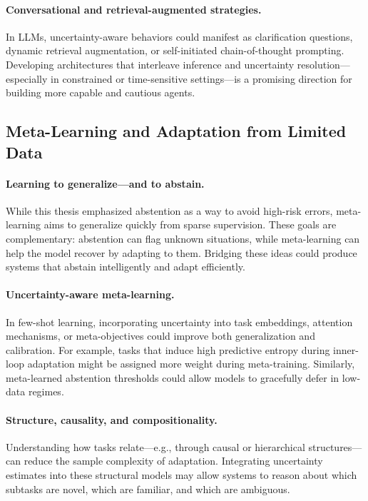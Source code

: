 \paragraph{Conversational and retrieval-augmented strategies.} In LLMs, uncertainty-aware behaviors could manifest as clarification questions, dynamic retrieval augmentation, or self-initiated chain-of-thought prompting. Developing architectures that interleave inference and uncertainty resolution—especially in constrained or time-sensitive settings—is a promising direction for building more capable and cautious agents.

\subsection{Meta-Learning and Adaptation from Limited Data}

\paragraph{Learning to generalize—and to abstain.} While this thesis emphasized abstention as a way to avoid high-risk errors, meta-learning aims to generalize quickly from sparse supervision. These goals are complementary: abstention can flag unknown situations, while meta-learning can help the model recover by adapting to them. Bridging these ideas could produce systems that abstain intelligently and adapt efficiently.

\paragraph{Uncertainty-aware meta-learning.} In few-shot learning, incorporating uncertainty into task embeddings, attention mechanisms, or meta-objectives could improve both generalization and calibration. For example, tasks that induce high predictive entropy during inner-loop adaptation might be assigned more weight during meta-training. Similarly, meta-learned abstention thresholds could allow models to gracefully defer in low-data regimes.

\paragraph{Structure, causality, and compositionality.} Understanding how tasks relate—e.g., through causal or hierarchical structures—can reduce the sample complexity of adaptation. Integrating uncertainty estimates into these structural models may allow systems to reason about which subtasks are novel, which are familiar, and which are ambiguous.


